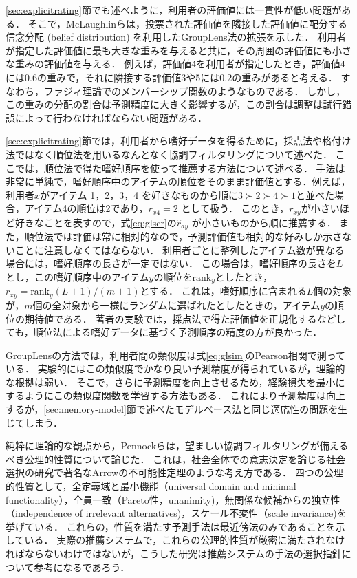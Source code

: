 \ref{sec:explicitrating}節でも述べように，利用者の評価値には一貫性が低い問題がある．
そこで，McLaughlinら\cite{sigir:04:01}は，投票された評価値を隣接した評価値に配分する信念分配 (belief distribution) を利用したGroupLens法の拡張を示した．
利用者が指定した評価値に最も大きな重みを与えると共に，その周囲の評価値にも小さな重みの評価値を与える．
例えば，評価値4を利用者が指定したとき，評価値4には$0.6$の重みで，それに隣接する評価値3や5には$0.2$の重みがあると考える．
すなわち，ファジィ理論でのメンバーシップ関数のようなものである．
しかし，この重みの分配の割合は予測精度に大きく影響するが，この割合は調整は試行錯誤によって行わなければならない問題がある．

\ref{sec:explicitrating}節では，利用者から嗜好データを得るために，採点法や格付け法ではなく順位法を用いるなんとなく協調フィルタリング\cite{epublist:039}について述べた．
ここでは，順位法で得た嗜好順序を使って推薦する方法について述べる．
手法は非常に単純で，嗜好順序中のアイテムの順位をそのまま評価値とする．例えば，利用者$x$がアイテム 1，2，3，4 を好きなものから順に$3{\succ}2{\succ}4{\succ}1$と並べた場合，アイテム4の順位は2であり，$r_{x4}=2$ として扱う．
このとき，$r_{xy}$が小さいほど好きなことを表すので，式\eqref{eq:glscr}の$\hat{r}_{ay}$ が小さいものから順に推薦する．
また，順位法では評価は常に相対的なので，予測評価値も相対的な好みしか示さないことに注意しなくてはならない．
利用者ごとに整列したアイテム数が異なる場合には，嗜好順序の長さが一定ではない．
この場合は，嗜好順序の長さを$L$とし，この嗜好順序中のアイテム$y$の順位を$\mathrm{rank}_y$としたとき，$r_{xy}=\mathrm{rank}_y(L+1)/(m+1)$とする．
これは，嗜好順序に含まれる$L$個の対象が，$m$個の全対象から一様にランダムに選ばれたとしたときの，アイテム$y$の順位の期待値である．
著者の実験\cite{epublist:064}では，採点法で得た評価値を正規化するなどしても，順位法による嗜好データに基づく予測順序の精度の方が良かった．

GroupLensの方法では，利用者間の類似度は式\eqref{eq:glsim}のPearson相関で測っている．
実験的にはこの類似度でかなり良い予測精度が得られているが，理論的な根拠は弱い．
そこで，さらに予測精度を向上させるため，経験損失を最小にするようにこの類似度関数を学習する方法\cite{kdd:07:01}もある．
これにより予測精度は向上するが，\ref{sec:memory-model}節で述べたモデルベース法と同じ適応性の問題を生じてしまう．

純粋に理論的な観点から，Pennockら\cite{aaai:00:02}は，望ましい協調フィルタリングが備えるべき公理的性質について論じた．
これは，社会全体での意志決定を論じる社会選択の研究で著名なArrowの不可能性定理\cite{eb:040:00}のような考え方である．
四つの公理的性質として，全定義域と最小機能（universal domain and minimal functionality），全員一致（Pareto性，unanimity)，無関係な候補からの独立性（independence of irrelevant alternatives)，スケール不変性（scale invariance)を挙げている．
これらの，性質を満たす予測手法は最近傍法のみであることを示している．
実際の推薦システムで，これらの公理的性質が厳密に満たされなければならないわけではないが，こうした研究は推薦システムの手法の選択指針について参考になるであろう．
